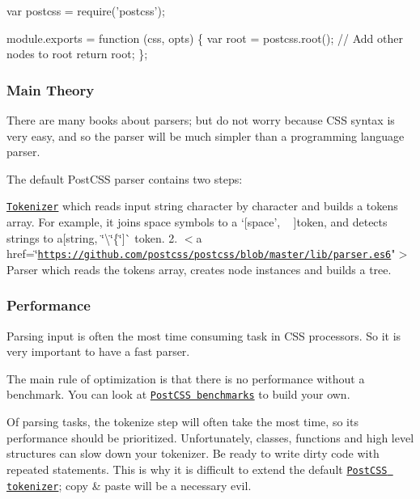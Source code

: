 \begin{DoxyCode}
var postcss = require('postcss');

module.exports = function (css, opts) \{
    var root = postcss.root();
    // Add other nodes to root
    return root;
\};
\end{DoxyCode}


\subsubsection*{Main Theory}

There are many books about parsers; but do not worry because C\+SS syntax is very easy, and so the parser will be much simpler than a programming language parser.

The default Post\+C\+SS parser contains two steps\+:


\begin{DoxyEnumerate}
\item \href{https://github.com/postcss/postcss/blob/master/lib/tokenize.es6}{\tt Tokenizer} which reads input string character by character and builds a tokens array. For example, it joins space symbols to a `\mbox{[}\textquotesingle{}space', \textquotesingle{}~\newline
 \textquotesingle{}\mbox{]}{\ttfamily  token, and detects strings to a}\mbox{[}\textquotesingle{}string\textquotesingle{}, \textquotesingle{}\char`\"{}\textbackslash{}\char`\"{}\{\char`\"{}\textquotesingle{}\mbox{]}\`{} token.
2. $<$a href=\char`\"{}\href{https://github.com/postcss/postcss/blob/master/lib/parser.es6}{\tt https\+://github.\+com/postcss/postcss/blob/master/lib/parser.\+es6}"$>$Parser which reads the tokens array, creates node instances and builds a tree.
\end{DoxyEnumerate}

\subsubsection*{Performance}

Parsing input is often the most time consuming task in C\+SS processors. So it is very important to have a fast parser.

The main rule of optimization is that there is no performance without a benchmark. You can look at \href{https://github.com/postcss/benchmark}{\tt Post\+C\+SS benchmarks} to build your own.

Of parsing tasks, the tokenize step will often take the most time, so its performance should be prioritized. Unfortunately, classes, functions and high level structures can slow down your tokenizer. Be ready to write dirty code with repeated statements. This is why it is difficult to extend the default \href{https://github.com/postcss/postcss/blob/master/lib/tokenize.es6}{\tt Post\+C\+SS tokenizer}; copy \& paste will be a necessary evil.

